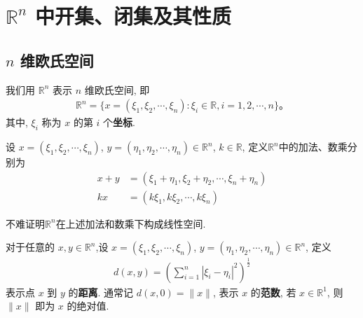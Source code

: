 \documentclass[../../main.tex]{subfiles}
\begin{document}
\section{$\mathbb{R}^n$ 中开集、闭集及其性质}

\subsection{$n$ 维欧氏空间}

\begin{definition}
我们用 $\mathbb{R}^n$ 表示 $n$ 维欧氏空间, 即
\begin{align*}
\mathbb{R}^n = \{x = (\xi_1, \xi_2, \cdots, \xi_n) : \xi_i \in \mathbb{R}, i = 1, 2, \cdots, n\}。
\end{align*}
其中, $\xi_i$ 称为 $x$ 的第 $i$ 个\textbf{坐标}.
\end{definition}

\begin{definition}
设 $x = (\xi_1, \xi_2, \cdots, \xi_n)$, $y = (\eta_1, \eta_2, \cdots, \eta_n) \in \mathbb{R}^n$, $k \in \mathbb{R}$, 定义$\mathbb{R}^n$中的加法、数乘分别为
\begin{align*}
x + y &= (\xi_1 + \eta_1, \xi_2 + \eta_2, \cdots, \xi_n + \eta_n)\\
kx &= (k\xi_1, k\xi_2, \cdots, k\xi_n)
\end{align*}
\end{definition}
\begin{note}
不难证明$\mathbb{R}^n$在上述加法和数乘下构成线性空间.
\end{note}

\begin{definition}
对于任意的 $x, y \in \mathbb{R}^n$,设 $x = (\xi_1, \xi_2, \cdots, \xi_n)$, $y = (\eta_1, \eta_2, \cdots, \eta_n) \in \mathbb{R}^n$, 定义
\begin{align*}
d(x, y) = \left(\sum_{i = 1}^{n}|\xi_i - \eta_i|^2\right)^{\frac{1}{2}}
\end{align*}
表示点 $x$ 到 $y$ 的\textbf{距离}. 通常记 $d(x, 0) = \|x\|$, 表示 $x$ 的\textbf{范数}, 若 $x \in \mathbb{R}^1$, 则 $\|x\|$ 即为 $x$ 的绝对值.
\end{definition}
\end{document}
